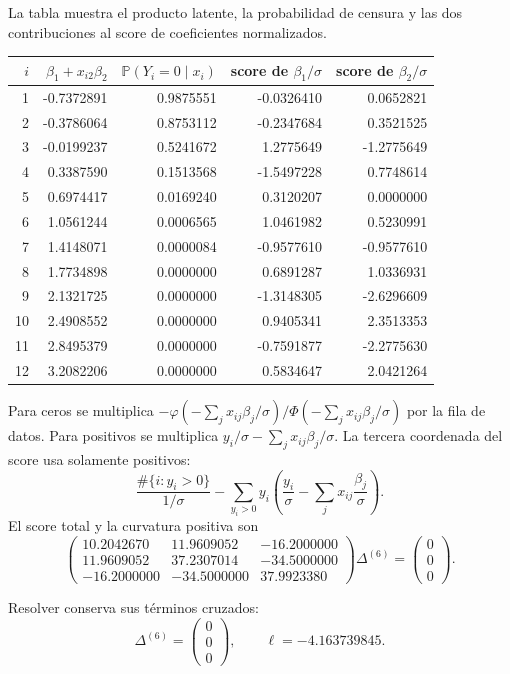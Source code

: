 \documentclass[11pt,a4paper]{article}
\newcommand{\Prob}{\mathbb P}
\begin{document}
La tabla muestra el producto latente,
la probabilidad de censura y
las dos contribuciones al score
de coeficientes normalizados.
\begin{center}\small\begin{tabular}{rrrrr}\toprule
\(i\)&\(\beta_1+x_{i2}\beta_2\)&\(\Prob(Y_i=0\mid x_i)\)&score de \(\beta_1/\sigma\)&score de \(\beta_2/\sigma\)\\\midrule
1&-0.7372891&0.9875551&-0.0326410&0.0652821\\
2&-0.3786064&0.8753112&-0.2347684&0.3521525\\
3&-0.0199237&0.5241672&1.2775649&-1.2775649\\
4&0.3387590&0.1513568&-1.5497228&0.7748614\\
5&0.6974417&0.0169240&0.3120207&0.0000000\\
6&1.0561244&0.0006565&1.0461982&0.5230991\\
7&1.4148071&0.0000084&-0.9577610&-0.9577610\\
8&1.7734898&0.0000000&0.6891287&1.0336931\\
9&2.1321725&0.0000000&-1.3148305&-2.6296609\\
10&2.4908552&0.0000000&0.9405341&2.3513353\\
11&2.8495379&0.0000000&-0.7591877&-2.2775630\\
12&3.2082206&0.0000000&0.5834647&2.0421264\\\bottomrule\end{tabular}\end{center}
Para ceros se multiplica
\(-\varphi(-\sum_jx_{ij}\beta_j/\sigma)/
\Phi(-\sum_jx_{ij}\beta_j/\sigma)\)
por la fila de datos.
Para positivos se multiplica
\(y_i/\sigma-\sum_jx_{ij}\beta_j/\sigma\).
La tercera coordenada del score
usa solamente positivos:
\[
\frac{\#\{i:y_i>0\}}{1/\sigma}
-\sum_{y_i>0}y_i\left(\frac{y_i}{\sigma}
-\sum_jx_{ij}\frac{\beta_j}{\sigma}\right).
\]
El score total y la curvatura positiva son
\[
\begin{pmatrix}10.2042670&11.9609052&-16.2000000\\11.9609052&37.2307014&-34.5000000\\-16.2000000&-34.5000000&37.9923380\end{pmatrix}\Delta^{(6)}=\begin{pmatrix}0\\0\\0\end{pmatrix}.
\]

Resolver conserva sus términos cruzados:
\[
\Delta^{(6)}=\begin{pmatrix}0\\0\\0\end{pmatrix},\qquad\ell=-4.163739845.
\]
\end{document}

